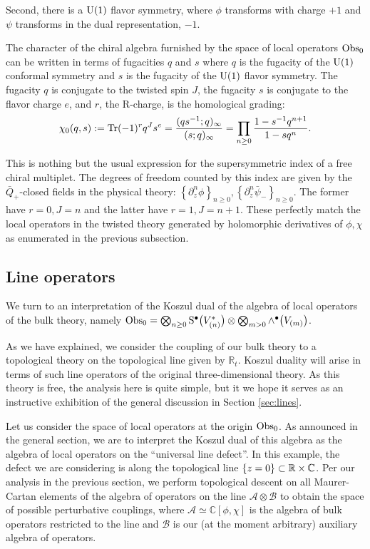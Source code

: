 \documentclass[11pt]{amsart}
\begin{document}
Second, there is a ${\rm U}(1)$ flavor symmetry, where $\phi$ transforms with charge $+1$ and $\psi$ transforms in the dual representation, $-1$.

The character of the chiral algebra furnished by the space of local operators ${\rm Obs}_0$ can be written in terms of fugacities $q$ and $s$ where $q$ is the fugacity of the ${\rm U}(1)$ conformal symmetry and $s$ is the fugacity of the ${\rm U}(1)$ flavor symmetry. The fugacity $q$ is conjugate to the twisted spin $J$, the fugacity $s$ is conjugate to the flavor charge $e$, and $r$, the R-charge, is the homological grading:
\[
\chi_0(q , s) := \operatorname{Tr} (-1)^r q^J s^e =  \frac{(q s^{-1} ; q)_\infty}{(s ; q)_\infty}  = \prod_{n \geq 0} \frac{1 - s^{-1} q^{n+1}}{1 - s q^n}.
\]

This is nothing but the usual expression for the supersymmetric index of a free chiral multiplet. The degrees of freedom counted by this index are given by the $\bar{Q}_+$-closed fields in the physical theory: $\left\lbrace \partial_z^n \phi \right\rbrace_{n \geq 0}, \left\lbrace \partial_z^n \bar{\psi}_- \right\rbrace_{n \geq 0}$. The former have $r=0, J = n$ and the latter have $r=1, J= n+1$. These perfectly match the local operators in the twisted theory generated by holomorphic derivatives of $\phi, \chi$ as enumerated in the previous subsection.

\subsection*{Line operators}

We turn to an interpretation of the Koszul dual of the algebra of local operators of the bulk theory, namely ${\rm Obs}_0 = \bigotimes_{n \geq 0} {\rm S}^\bullet \big(V^*_{(n)}\big) \otimes \bigotimes_{m > 0} \wedge^\bullet \big(V_{(m)}\big)$. 

As we have explained, we consider the coupling of our bulk theory to a topological theory on the topological line given by $\mathbb{R}_t$. Koszul duality will arise in terms of such line operators of the original three-dimensional theory. 
As this theory is free, the analysis here is quite simple, but it we hope it serves as an instructive exhibition of the general discussion in Section \ref{sec:lines}. 

Let us consider the space of local operators at the origin ${\rm Obs}_0$. 
As announced in the general section, we are to interpret the Koszul dual of this algebra as the algebra of local operators on the ``universal line defect''.
In this example, the defect we are considering is along the topological line $\{z=0\} \subset \mathbb R \times \mathbb C$. 
Per our analysis in the previous section, we perform topological descent on all Maurer-Cartan elements of the algebra of operators on the line $\mathcal{A}\otimes \mathcal{B}$ to obtain the space of possible perturbative couplings, where $\mathcal{A} \simeq \mathbb{C}[\phi, \chi]$ is the algebra of bulk operators restricted to the line and $\mathcal{B}$ is our (at the moment arbitrary) auxiliary algebra of operators. 
\end{document}
